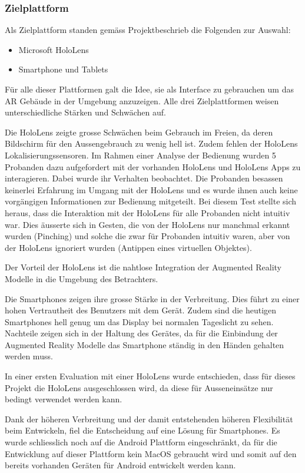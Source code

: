 \documentclass[a4paper]{scrreprt}
\begin{document}
\subsubsection{Zielplattform}
Als Zielplattform standen gemäss Projektbeschrieb die Folgenden zur Auswahl:
\begin{itemize}
\item Microsoft HoloLens
\item Smartphone und Tablets
\end{itemize}
Für alle dieser Plattformen galt die Idee, sie als Interface zu gebrauchen um das AR Gebäude in der Umgebung anzuzeigen. Alle drei Zielplattformen weisen unterschiedliche Stärken und Schwächen auf.

Die HoloLens zeigte grosse Schwächen beim Gebrauch im Freien, da deren Bildschirm für den Aussengebrauch zu wenig hell ist.
Zudem fehlen der HoloLens Lokalisierungssensoren. Im Rahmen einer Analyse der Bedienung wurden 5 Probanden dazu aufgefordert mit der vorhanden HoloLens und HoloLens Apps zu interagieren. Dabei wurde ihr Verhalten beobachtet. Die Probanden besassen keinerlei Erfahrung im Umgang mit der HoloLens und es wurde ihnen auch keine vorgängigen Informationen zur Bedienung mitgeteilt. Bei diesem Test stellte sich heraus, dass die Interaktion mit der HoloLens für alle Probanden nicht intuitiv war. Dies äusserte sich in Gesten, die von der HoloLens nur manchmal erkannt wurden (Pinching) und solche die zwar für Probanden intuitiv waren, aber von der HoloLens ignoriert wurden (Antippen eines virtuellen Objektes).

Der Vorteil der HoloLens ist die nahtlose Integration der Augmented Reality Modelle in die Umgebung des Betrachters.

Die Smartphones zeigen ihre grosse Stärke in der Verbreitung. Dies führt zu einer hohen Vertrautheit des Benutzers mit dem Gerät. Zudem sind die heutigen Smartphones hell genug um das Display bei normalen Tageslicht zu sehen.
Nachteile zeigen sich in der Haltung des Gerätes, da für die Einbindung der Augmented Reality Modelle das Smartphone ständig in den Händen gehalten werden muss.

In einer ersten Evaluation mit einer HoloLens wurde entschieden, dass für dieses Projekt die HoloLens ausgeschlossen wird, da diese für Ausseneinsätze nur bedingt verwendet werden kann.

Dank der höheren Verbreitung und der damit entstehenden höheren Flexibilität beim Entwickeln, fiel die Entscheidung auf eine Lösung für Smartphones. Es wurde schliesslich noch auf die Android Plattform eingeschränkt, da für die Entwicklung auf dieser Plattform kein MacOS gebraucht wird und somit auf den bereits vorhanden Geräten für Android entwickelt werden kann.
\end{document}
